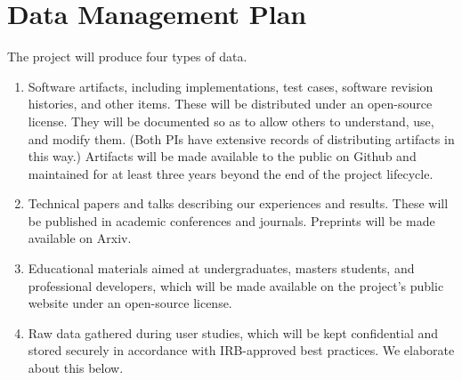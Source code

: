 \section*{Data Management Plan}

The project will produce four types of data.

\begin{enumerate}
\item Software artifacts,
including implementations, test cases, software revision histories, and
other items.  These will be distributed under an open-source
license.  They will be documented so as to allow others to understand,
use, and modify them.  (Both PIs have extensive records of
distributing artifacts in this way.)  Artifacts will be made available
to the public on Github and maintained for at least three years beyond
the end of the project lifecycle.

\item Technical papers and talks describing our experiences
and results.  These will be published in academic conferences and journals.
Preprints will be made available on Arxiv.

\item Educational materials aimed at undergraduates, masters students,
and professional developers, which will be made available on the
project's public website under an open-source license.

\item Raw data gathered during user studies, which will be kept
confidential and stored securely in accordance with IRB-approved best
practices. We elaborate about this below.
\end{enumerate}

